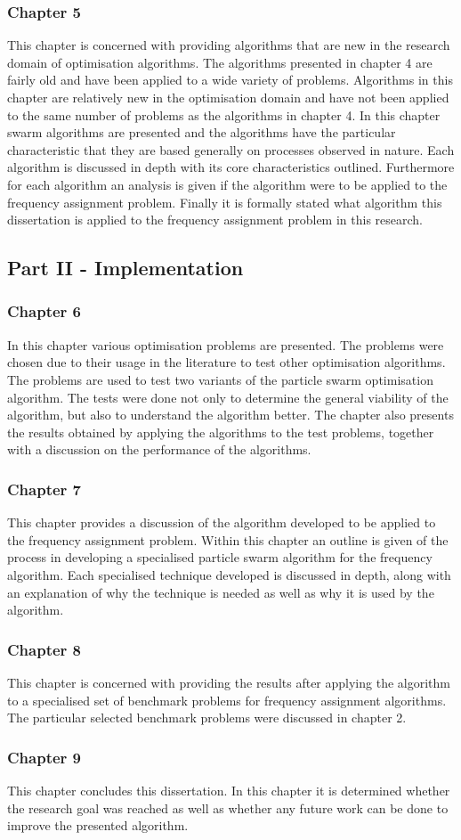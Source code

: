 \subsubsection{Chapter 5}
This chapter is concerned with providing algorithms that are new in the research domain of optimisation algorithms. The algorithms presented in chapter 4 are fairly old and have been applied to a wide variety of problems. Algorithms in this chapter are relatively new in the optimisation domain and have not been applied to the same number of problems as the algorithms in chapter 4. In this chapter swarm algorithms are presented and the algorithms have the particular characteristic that they are based generally on processes observed in nature. Each algorithm is discussed in depth with its core characteristics outlined. Furthermore for each algorithm an analysis is given if the algorithm were to be applied to the frequency assignment problem. Finally it is formally stated what algorithm this dissertation is applied to the frequency assignment problem in this research.
\subsection{Part II - Implementation}
\subsubsection{Chapter 6}
In this chapter various optimisation problems are presented. The problems were chosen due to their usage in the literature to test other optimisation algorithms. The problems are used to test two variants of the particle swarm optimisation algorithm. The tests were done not only to determine the general viability of the algorithm, but also to understand the algorithm better. The chapter also presents the results obtained by applying the algorithms to the test problems, together with a discussion on the performance of the algorithms.
\subsubsection{Chapter 7}
This chapter provides a discussion of the algorithm developed to be applied to the frequency assignment problem. Within this chapter an outline is given of the process in developing a specialised particle swarm algorithm for the frequency algorithm. Each specialised technique developed is discussed in depth, along with an explanation of why the technique is needed as well as why it is used by the algorithm.
\subsubsection{Chapter 8}
This chapter is concerned with providing the results after applying the algorithm to a specialised set of benchmark problems for frequency assignment algorithms. The particular selected benchmark problems were discussed in chapter 2.
\subsubsection{Chapter 9}
This chapter concludes this dissertation. In this chapter it is determined whether the research goal was reached as well as whether any future work can be done to improve the presented algorithm.
